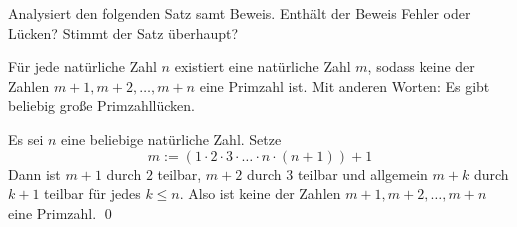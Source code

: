 \begin{aufg}[Fehlersuche II]
Analysiert den folgenden Satz samt Beweis. Enthält der Beweis Fehler oder Lücken? Stimmt der Satz überhaupt?
\begin{sat}
 Für jede natürliche Zahl $n$ existiert eine natürliche Zahl $m$, sodass keine der Zahlen $m+1,m+2,\dots , m+n$ eine Primzahl ist. Mit anderen Worten: Es gibt beliebig große Primzahllücken. 
\end{sat}
\begin{bew}
 Es sei $n$ eine beliebige natürliche Zahl. Setze 
 \[ m:= (1 \cdot 2 \cdot 3 \cdot \ldots \cdot n \cdot(n+1)) +1 \]
 Dann ist $m+1$ durch $2$ teilbar, $m+2$ durch $3$ teilbar und allgemein $m+k$ durch $k+1$ teilbar für jedes $k\le n$. Also ist keine der Zahlen $m+1,m+2,\dots , m+n$ eine Primzahl. \qed
\end{bew}
\end{aufg}




